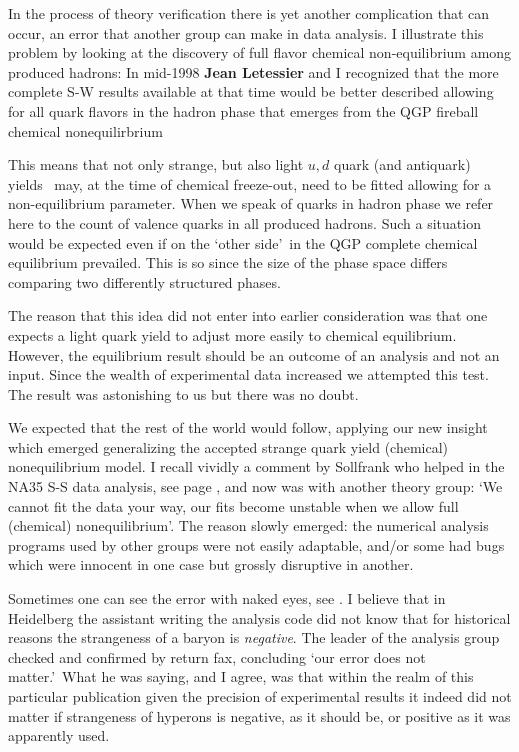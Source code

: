 In the process of theory verification there is yet another complication that can occur, an error that another group can make in data analysis. I illustrate this problem  by looking at the discovery of full flavor chemical non-equilibrium among produced hadrons: In mid-1998 \textbf{Jean Letessier} and I recognized that the more complete S-W results available at that time would be better described allowing for all quark flavors in the hadron phase that emerges from the QGP fireball chemical nonequilirbrium 

This means that not only strange, but also light $u,d$ quark (and antiquark) yields~\cite{Letessier:1998sz} may, at the time of chemical freeze-out, need to be fitted allowing for a non-equilibrium parameter. When we speak of quarks in hadron phase we refer here to the count of valence quarks in all produced hadrons. Such a situation would be expected even if on the \lq other side\rq\ in the QGP complete chemical equilibrium prevailed. This is so since the size of the phase space differs comparing two differently structured phases. 

The reason that this idea did not enter into earlier consideration was that one expects a light quark yield to adjust more easily to chemical equilibrium. However, the equilibrium result should be an outcome of an analysis and not an input. Since the wealth of experimental data increased we attempted this test. The result was astonishing to us but there was no doubt.

We expected that the rest of the world would follow, applying our new insight which emerged generalizing the accepted strange quark yield (chemical) nonequilibrium model. I recall vividly a comment by Sollfrank who helped in the NA35 S-S data analysis, see page \pageref{UHentro}, and now was with another theory group: \lq We cannot fit the data your way, our fits become unstable when we allow full (chemical) nonequilibrium\rq. The reason slowly emerged: the numerical analysis programs used by other groups were not easily adaptable, and/or some had bugs which were innocent in one case but grossly disruptive in another. 

Sometimes one can see the error with naked eyes, see . I believe that in Heidelberg the assistant writing the analysis code did not know that for historical reasons the strangeness of a baryon is \emph{negative}. The leader of the analysis group checked and confirmed by return fax, concluding \lq our error does not matter.\rq\ What he was saying, and I agree, was that within the realm of this particular publication given the precision of experimental results it indeed did not matter if strangeness of hyperons is negative, as it should be, or positive as it was apparently used.

